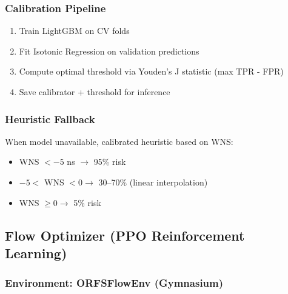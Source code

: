 \documentclass[10pt,conference]{IEEEtran}
\begin{document}
\subsubsection{Calibration Pipeline}
\begin{enumerate}
    \item Train LightGBM on CV folds
    \item Fit Isotonic Regression on validation predictions
    \item Compute optimal threshold via Youden's J statistic (max TPR - FPR)
    \item Save calibrator + threshold for inference
\end{enumerate}

\subsubsection{Heuristic Fallback}
When model unavailable, calibrated heuristic based on WNS:
\begin{itemize}
    \item WNS $< -5$ ns $\rightarrow$ 95\% risk
    \item $-5 <$ WNS $< 0 \rightarrow$ 30--70\% (linear interpolation)
    \item WNS $\ge 0 \rightarrow$ 5\% risk
\end{itemize}

\subsection{Flow Optimizer (PPO Reinforcement Learning)}
\label{sec:flow_optimizer}

\subsubsection{Environment: ORFSFlowEnv (Gymnasium)}
\end{document}
